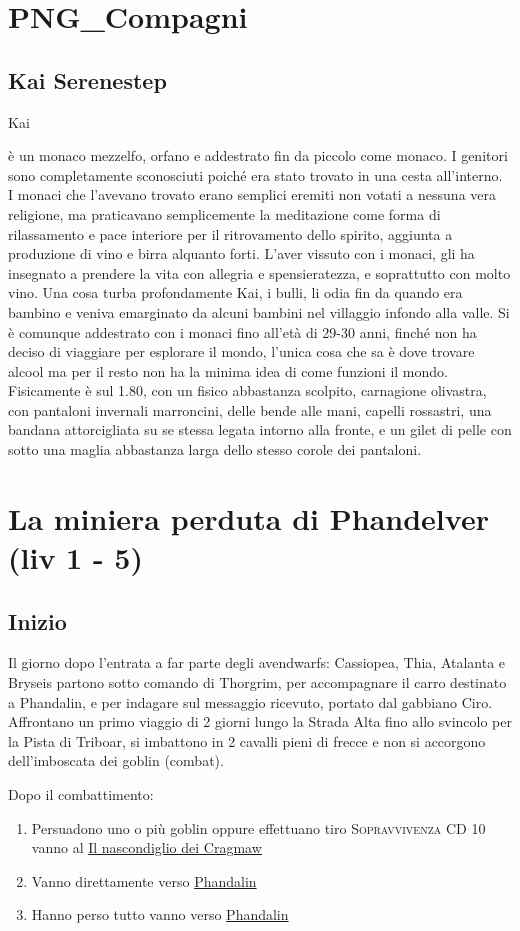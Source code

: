 \documentclass{article}
\begin{document}
\section{PNG\_Compagni}
\subsection{Kai Serenestep}\hypertarget{kai}{Kai} è un monaco mezzelfo, orfano e addestrato fin da piccolo come monaco. I genitori sono completamente sconosciuti poiché era stato trovato in una cesta all'interno. I monaci che l'avevano trovato erano semplici eremiti non votati a nessuna vera religione, ma praticavano semplicemente la meditazione come forma di rilassamento e pace interiore per il ritrovamento dello spirito, aggiunta a produzione di vino e birra alquanto forti. L'aver vissuto con i monaci, gli ha insegnato a prendere la vita con allegria e spensieratezza, e soprattutto con molto vino. Una cosa turba profondamente Kai, i bulli, li odia fin da quando era bambino e veniva emarginato da alcuni bambini nel villaggio infondo alla valle. Si è comunque addestrato con i monaci fino all'età di 29-30 anni, finché non ha deciso di viaggiare per esplorare il mondo, l'unica cosa che sa è dove trovare alcool ma per il resto non ha la minima idea di come funzioni il mondo. Fisicamente è sul 1.80, con un fisico abbastanza scolpito, carnagione olivastra, con pantaloni invernali marroncini, delle bende alle mani, capelli rossastri, una bandana attorcigliata su se stessa legata intorno alla fronte, e un gilet di pelle con sotto una maglia abbastanza larga dello stesso corole dei pantaloni.  
\section{La miniera perduta di Phandelver (liv 1 - 5)}
\subsection{Inizio}
Il giorno dopo l'entrata a far parte degli avendwarfs: Cassiopea, Thia, Atalanta e Bryseis partono sotto comando di Thorgrim, per accompagnare il carro destinato a Phandalin, e per indagare sul messaggio ricevuto, portato dal gabbiano Ciro. Affrontano un primo viaggio di 2 giorni lungo la Strada Alta fino allo svincolo per la Pista di Triboar, si imbattono in 2 cavalli pieni di frecce e non si accorgono dell'imboscata dei goblin (combat).

Dopo il combattimento: 
    \begin{enumerate}
        \item Persuadono uno o più goblin oppure effettuano tiro \textsc{Sopravvivenza} CD 10 vanno al \hyperlink{cragmaw}{Il nascondiglio dei Cragmaw}
        \item Vanno direttamente verso \hyperlink{phandlin}{Phandalin}
        \item Hanno perso tutto vanno verso \hyperlink{phandalin}{Phandalin}
    \end{enumerate}
\end{document}
